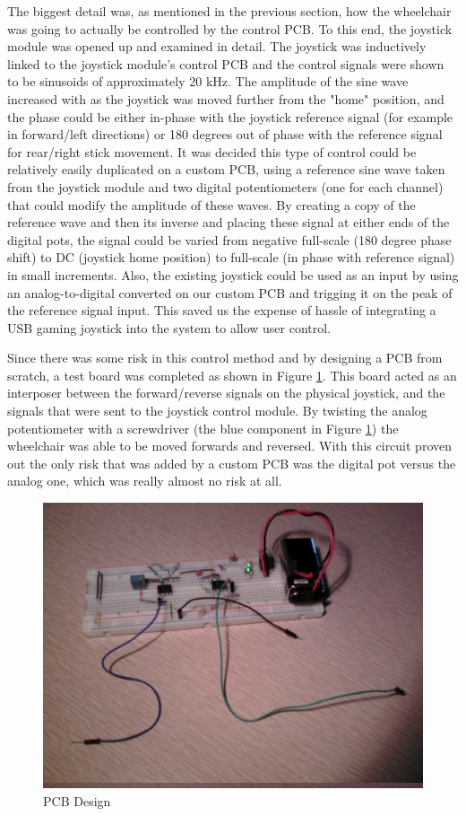 \documentclass[oneside,final,a4paper]{report}
\begin{document}
The biggest detail was, as mentioned in the previous section, how the wheelchair was going to actually be controlled by the control PCB. To this end, the joystick module was opened up and examined in detail. The joystick was inductively linked to the joystick module's control PCB and the control signals were shown to be sinusoids of approximately 20 kHz. The amplitude of the sine wave increased with as the joystick was moved further from the "home" position, and the phase could be either in-phase with the joystick reference signal (for example in forward/left directions) or 180 degrees out of phase with the reference signal for rear/right stick movement. It was decided this type of control could be relatively easily duplicated on a custom PCB, using a reference sine wave taken from the joystick module and two digital potentiometers (one for each channel) that could modify the amplitude of these waves. By creating a copy of the reference wave and then its inverse and placing these signal at either ends of the digital pots, the signal could be varied from negative full-scale (180 degree phase shift) to DC (joystick home position) to full-scale (in phase with reference signal) in small increments. Also, the existing joystick could be used as an input by using an analog-to-digital converted on our custom PCB and trigging it on the peak of the reference signal input. This saved us the expense of hassle of integrating a USB gaming joystick into the system to allow user control.

Since there was some risk in this control method and by designing a PCB from scratch, a test board was completed as shown in Figure \ref{fig:test_joystick}. This board acted as an interposer between the forward/reverse signals on the physical joystick, and the signals that were sent to the joystick control module. By twisting the analog potentiometer with a screwdriver (the blue component in Figure \ref{fig:test_joystick}) the wheelchair was able to be moved forwards and reversed. With this circuit proven out the only risk that was added by a custom PCB was the digital pot versus the analog one, which was really almost no risk at all.
\begin{figure}[hbt]
 \centering
 \includegraphics[scale=0.5]{test_circuit}
 \caption{PCB Design}\label{fig:test_joystick}
\end{figure}
\end{document}
